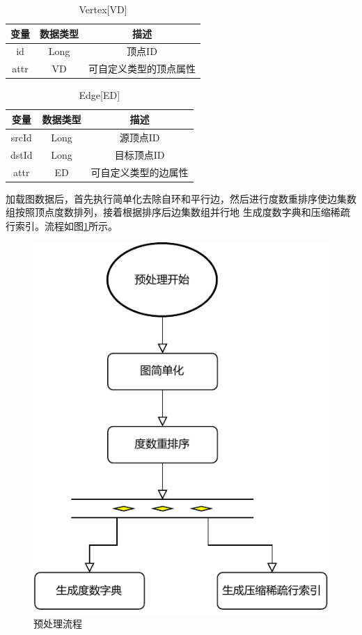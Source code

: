 \documentclass[master]{thesis-uestc}
\begin{document}
\begin{table}
    \caption{Vertex[VD]}
    \begin{tabular}{|c|c|c|}
     \hline
     变量 & 数据类型 & 描述\\
     \hline
     id &  Long & 顶点ID\\
     attr & VD & 可自定义类型的顶点属性\\
     \hline
    \end{tabular} 
    \label{tab:class-vertex}
\end{table}

\begin{table}
    \caption{Edge[ED]}
        \begin{tabular}{|c|c|c|}
        \hline
        变量 & 数据类型 & 描述\\
        \hline
        srcId &  Long & 源顶点ID\\
        dstId &  Long & 目标顶点ID\\
        attr & ED & 可自定义类型的边属性\\
        \hline
        \end{tabular} 
    
    \label{tab:class-edge}
\end{table}
    
    加载图数据后，首先执行简单化去除自环和平行边，然后进行度数重排序使边集数组按照顶点度数排列，接着根据排序后边集数组并行地
生成度数字典和压缩稀疏行索引。流程如图\ref{fig:preprocess-flow}所示。
\begin{figure}
    \centering
    \includegraphics[width=.7\linewidth]{pic/preprocess_flow.pdf}
    \caption{预处理流程}
    \label{fig:preprocess-flow}
\end{figure}
\end{document}
